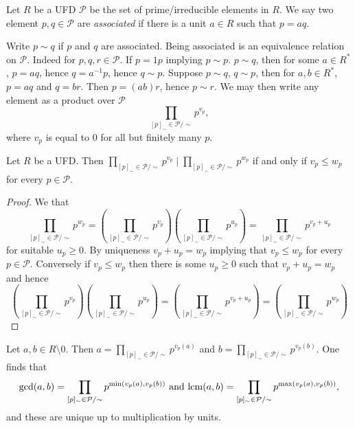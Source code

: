  \begin{definition}
     Let $R$ be a UFD $\mathcal{P}$ be the set of prime/irreducible elements in $R$. We say two element $p,q\in \mathcal{P}$ are \textit{associated} if there is a unit $a\in R$ such that $p = aq$.  
 \end{definition}
 \begin{remark} 
    Write $p \sim q$ if $p$ and $q$ are associated. Being   associated is an equivalence relation on $\mathcal{P}$. Indeed for $p,q,r\in \mathcal{P}$. If $p = 1p$ implying $p\sim p$. $p\sim q$, then for some $a\in R^\ast$, $p = aq$, hence $q = a^{-1}p$, hence $q\sim p$. Suppose $p\sim q$, $q\sim p$, then for $a,b\in R^\ast$, $p = aq$ and $q= br$. Then $p = (ab)r$, hence $p\sim r$. We may then write any element as a product over $\mathcal{P}$
    $$\prod_{[p]_\sim \in \mathcal{P}/\sim} p^{v_p},$$
    where $v_p$ is equal to $0$ for all but finitely many $p$.
 \end{remark}
 \begin{lemma}
     Let $R$ be a UFD. Then $\prod_{[p]_\sim \in \mathcal{P}/\sim} p^{v_p}\mid \prod_{[p]_\sim \in \mathcal{P}/\sim} p^{w_p}$ if and only if $v_p \leq w_p$ for every $p\in\mathcal{P}$.
 \end{lemma}
 \begin{proof}
     We that 
     $$\prod_{[p]_\sim \in \mathcal{P}/\sim} p^{w_p}=\left(\prod_{[p]_\sim \in \mathcal{P}/\sim} p^{v_p}\right)\left(\prod_{[p]_\sim \in \mathcal{P}/\sim} p^{u_p}\right) = \prod_{[p]_\sim \in \mathcal{P}/\sim} p^{v_p+u_p} $$
     for suitable $u_p\geq 0$. By uniqueness $v_p +u_p = w_p$ implying that $v_p\leq w_p$ for every $p\in\mathcal{P}$. Conversely if $v_p\leq w_p$ then there is some $u_p\geq 0$ such that $v_p + u_p = w_p$ and hence 
     $$\left(\prod_{[p]_\sim \in \mathcal{P}/\sim} p^{v_p}\right)\left(\prod_{[p]_\sim \in \mathcal{P}/\sim} p^{u_p}\right)=\left(\prod_{[p]_\sim \in \mathcal{P}/\sim} p^{v_p+u_p}\right) = \left(\prod_{[p]_\sim \in \mathcal{P}/\sim} p^{w_p}\right)$$
 \end{proof}
\begin{lemma}
    Let $a,b\in R\setminus 0$. Then $a = \prod_{[p]_\sim \in \mathcal{P}/\sim} p^{v_p(a)}$ and $b = \prod_{[p]_\sim \in \mathcal{P}/\sim} p^{v_p(b)}$. One finds that 
    $$\gcd(a,b) = \prod_{[p]_\sim \in \mathcal{P}/\sim} p^{\min\left(v_p(a),v_p(b)\right)} \text{ and } \mathrm{lcm}(a,b) = \prod_{[p]_\sim \in \mathcal{P}/\sim} p^{\max\left(v_p(a),v_p(b)\right)},$$
    and these are unique up to multiplication by units.
\end{lemma}
